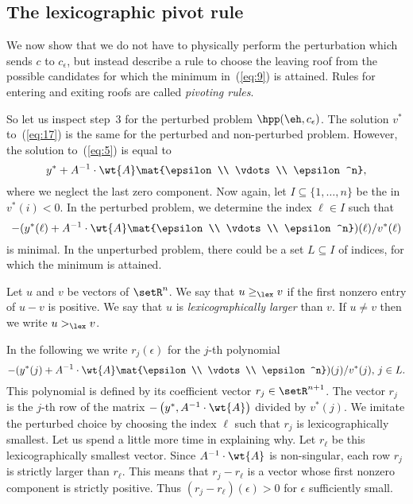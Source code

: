 \subsection{The lexicographic pivot rule}
\label{sec:lexic-pivot-rule}


We now show that we do not have to physically perform the
perturbation which sends $c$ to $c_\epsilon$, but instead describe a rule to
choose the leaving roof from the possible candidates for which the
minimum in~(\ref{eq:9}) is attained. Rules for entering and exiting
roofs are called \emph{pivoting rules}.  


So let us inspect step~3 for the perturbed problem
$\hpp(\eh,c_\epsilon)$. The solution $v^*$ to~(\ref{eq:17}) is the same for
the perturbed and non-perturbed problem. However, the solution
to~(\ref{eq:5})  is equal to 
\begin{equation}
  \label{eq:25}
  y^* + A^{-1} \cdot \wt{A} \mat{\epsilon \\ \vdots \\ \epsilon^n},
\end{equation}
where we neglect the last zero component. 
Now again, let $I \subseteq\{1,\ldots,n\}$ be the in $v^*(i)<0$. In the perturbed
problem, we determine the index $\ell \in I$ such that 
\begin{equation}
  \label{eq:26}
  - (y^*(\ell) + A^{-1} \cdot \wt{A} \mat{\epsilon \\ \vdots \\ \epsilon^n})(\ell) / v^*(\ell) 
\end{equation}
is minimal. In the unperturbed problem, there could be a set $L\subseteq I$ of
indices, for which the minimum is attained. 

\begin{definition}
  \label{def:2}
  Let $u$ and $v$ be vectors of $\setR^n$. We say that $u\geq_{\lex}v$ if the
  first nonzero entry of $u-v$ is positive. We say that $u$ is
  \emph{lexicographically larger} than $v$. If $u \neq v$ then we write $u>_{\lex}v$. 
\end{definition}
%
In the following we write $r_j(\epsilon)$ for the $j$-th polynomial  
\begin{equation}
  \label{eq:27}
  -(y^*(j) + A^{-1} \cdot \wt{A} \mat{\epsilon \\ \vdots \\ \epsilon^n})(j) / v^*(j), \, j \in L.
\end{equation}
%
This polynomial is defined by its coefficient vector $r_j\in
\setR^{n+1}$.  The vector $r_j$ is the $j$-th row of the matrix 
$- \left( y^*, A^{-1} \cdot \wt{A}\right)$ divided by $v^*(j)$. 
We imitate the perturbed choice by choosing the index $\ell$ such that 
$r_j$ is lexicographically smallest. 
Let us spend a little more time in explaining why.  Let $r_\ell$
be this lexicographically smallest vector. Since $ A^{-1} \cdot \wt{A}$ is
non-singular, each row $r_j$ is strictly larger than $r_\ell$. 
This means that $r_j - r_\ell$ is a vector whose first nonzero component
is strictly positive. Thus $(r_j - r_\ell)(\epsilon) >0$ for $\epsilon$ sufficiently
small. 


